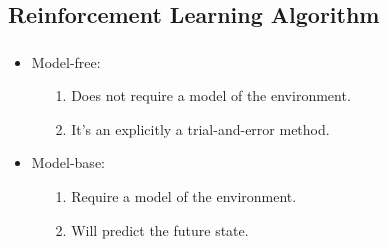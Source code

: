 \documentclass{beamer}
\begin{document}
    \subsection*{Reinforcement Learning Algorithm}
    \begin{frame}
        \frametitle{\subsecname}
        \begin{itemize}
            \item Model-free:
                \begin{itemize}
                    \item[1.] Does not require a model of the environment.
                    \item[2.] It's an explicitly a trial-and-error method.
                \end{itemize}
            \item Model-base:
                \begin{itemize}
                    \item[1.] Require a model of the environment.
                    \item[2.] Will predict the future state.
                \end{itemize}
        \end{itemize}

    \end{frame}
\end{document}
